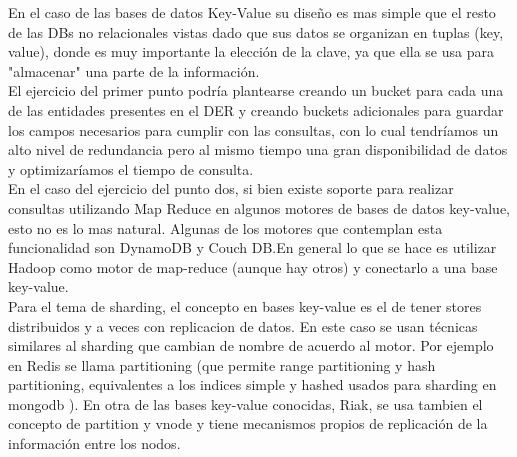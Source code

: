 En el caso de las bases de datos Key-Value su dise\~no es mas simple que el resto de las DBs no relacionales vistas dado que sus datos se organizan en tuplas (key, value), donde es muy importante la elecci\'on de la clave, ya que ella se usa para "almacenar" una parte de la informaci\'on. \\

El ejercicio del primer punto podr\'ia plantearse creando un bucket para cada una de las entidades presentes en el DER y creando buckets adicionales para guardar los campos necesarios para cumplir con las consultas, con lo cual tendr\'iamos un alto nivel de redundancia pero al mismo tiempo una gran disponibilidad de datos y optimizar\'iamos el tiempo de consulta.\\

En el caso del ejercicio del punto dos, si bien existe soporte para realizar consultas utilizando Map Reduce en algunos motores de bases de datos key-value, esto no es lo mas natural. Algunas de los motores que contemplan esta funcionalidad son DynamoDB y Couch DB.En general lo que se hace es utilizar Hadoop como motor de map-reduce (aunque hay otros) y conectarlo a una base key-value.\\

Para el tema de sharding, el concepto en bases key-value es el de tener stores distribuidos y a veces con replicacion de datos. En este caso se usan técnicas similares al sharding que cambian de nombre de acuerdo al motor. Por ejemplo en Redis se llama partitioning (que permite range partitioning y hash partitioning, equivalentes a los indices simple y hashed usados para sharding en mongodb ). En otra de las bases key-value conocidas, Riak, se usa tambien el concepto de partition y vnode y tiene mecanismos propios de replicación de la información entre los nodos.





